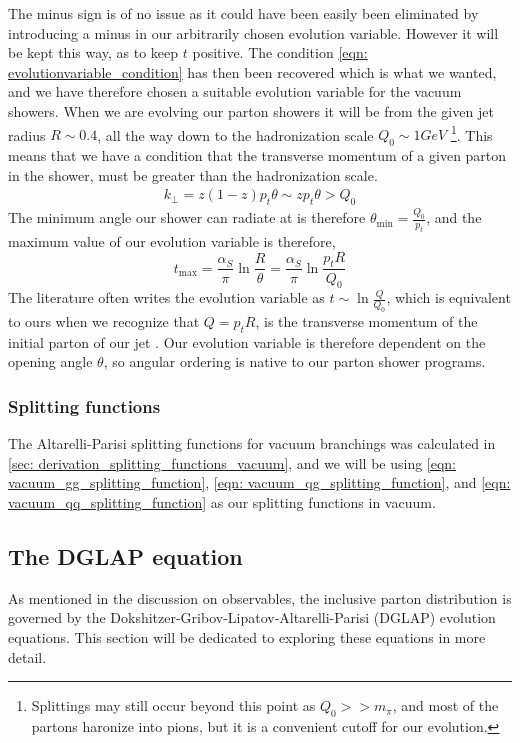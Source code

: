 \documentclass[main.tex]{subfiles}
\begin{document}
The minus sign is of no issue as it could have been easily been eliminated by introducing a minus in our arbitrarily chosen evolution variable. However it will be kept this way, as to keep \(t\) positive. The condition \autoref{eqn: evolutionvariable_condition} has then been recovered which is what we wanted, and we have therefore chosen a suitable evolution variable for the vacuum showers. When we are evolving our parton showers it will be from the given jet radius \(R \sim 0.4\), all the way down to the hadronization scale \(Q_0 \sim 1GeV\) \footnote{Splittings may still occur beyond this point as \(Q_0>>m_\pi\), and most of the partons haronize into pions, but it is a convenient cutoff for our evolution.}. This means that we have a condition that the transverse momentum of a given parton in the shower, must be greater than the hadronization scale. 
\begin{align}
    k_\perp = z(1-z)p_t \theta \sim z p_t \theta > Q_0
\end{align}
The minimum angle our shower can radiate at is therefore \(\theta_{\text{min}} = \frac{Q_0}{p_t}\), and the maximum value of our evolution variable is therefore,
\begin{equation}\label{eqn: evolution_variable__maximum_vacuum}
    t_{\text{max}} = \frac{\alpha_S}{\pi} \ln \frac{R}{\theta} = \frac{\alpha_S}{\pi} \ln \frac{p_tR}{Q_0}
\end{equation}
The literature often writes the evolution variable as \(t \sim \ln \frac{Q}{Q_0}\), which is equivalent to ours when we recognize that \(Q=p_tR\), is the transverse momentum of the initial parton of our jet . Our evolution variable is therefore dependent on the opening angle \(\theta\), so angular ordering is native to our parton shower programs.

\subsubsection*{Splitting functions}
The Altarelli-Parisi splitting functions for vacuum branchings was calculated in \autoref{sec: derivation_splitting_functions_vacuum}, and we will be using \autoref{eqn: vacuum_gg_splitting_function}, \autoref{eqn: vacuum_qg_splitting_function}, and \autoref{eqn: vacuum_qq_splitting_function} as our splitting functions in vacuum.

\subsection{The DGLAP equation}\label{sec: DGLAP_standard}
As mentioned in the discussion on observables, the inclusive parton distribution is governed by the Dokshitzer-Gribov-Lipatov-Altarelli-Parisi (DGLAP) evolution equations. This section will be dedicated to exploring these equations in more detail. \elab 
\end{document}
